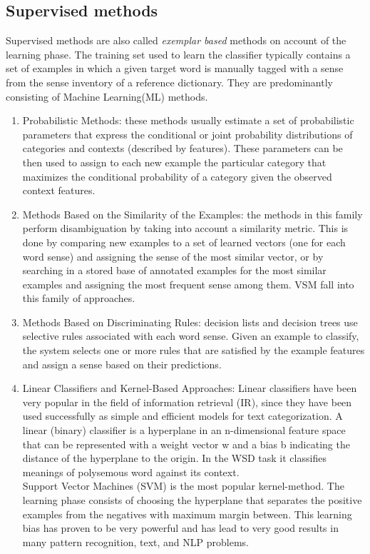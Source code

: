 \subsection{Supervised methods}
Supervised methods are also called \textit{exemplar based} methods on account of the learning phase. The training set used to
learn the classifier typically contains a set of examples in which a given target word is
manually tagged with a sense from the sense inventory of a reference dictionary. They are predominantly
consisting of Machine Learning(ML) methods. 
\begin{enumerate}
\item Probabilistic Methods: these methods usually estimate a set of probabilistic parameters that
express the conditional or joint probability distributions of categories and
contexts (described by features). These parameters can be then used to assign
to each new example the particular category that maximizes the conditional
probability of a category given the observed context features.
\item Methods Based on the Similarity of the Examples: the methods in this family perform 
disambiguation by taking into account
a similarity metric. This is done by comparing new examples to a set
of learned vectors (one for each word sense) and assigning the
sense of the most similar vector, or by searching in a stored base of annotated
examples for the most similar examples and assigning the most
frequent sense among them. VSM fall into this family of approaches. 
\item Methods Based on Discriminating Rules: decision lists and decision trees use selective rules associated with each
word sense. Given an example to classify, the system selects one or more
rules that are satisfied by the example features and assign a sense based on
their predictions. 
\item Linear Classifiers and Kernel-Based Approaches: 
Linear classifiers have been very popular in the field of information retrieval
(IR), since they have been used successfully as simple and efficient
models for text categorization. A linear (binary) classifier is a hyperplane
in an n-dimensional feature space that can be represented with a weight
vector w and a bias b indicating the distance of the hyperplane to the origin. In the WSD task it 
classifies meanings of polysemous word against its context. 
\\Support Vector Machines (SVM) is the most popular kernel-method. The learning phase consists of 
choosing the hyperplane that separates the positive examples from the negatives with
maximum margin between. This learning bias has proven to be very powerful
and has lead to very good results in many pattern recognition, text, and
NLP problems.
\end{enumerate}

